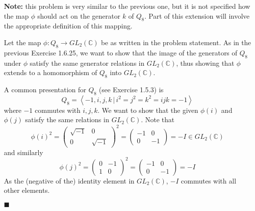\documentclass[12pt]{article}
\renewcommand{\qed}{\hfill$\blacksquare$}
\renewenvironment{proof}{\begin{addmargin}[1em]{0em}\begin{newproof}}{\end{newproof}\end{addmargin}\qed}
\begin{document}
\begin{proof}
\textbf{Note:} this problem is very similar to the previous one, but it is not specified how the map $\phi$ should act on the generator $k$ of $Q_8$. Part of this extension will involve the appropriate definition of this mapping.

Let the map $\phi: Q_8 \rightarrow GL_2\left(\mathbb{C}\right)$ be as written in the problem statement. As in the previous Exercise 1.6.25, we want to show that the image of the generators of $Q_8$ under $\phi$ satisfy the same generator relations in $GL_2\left(\mathbb{C}\right)$, thus showing that $\phi$ extends to a homomorphism of $Q_8$ into $GL_2\left(\mathbb{C}\right)$.

A common presentation for $Q_8$ (see Exercise 1.5.3) is
$$ Q_8 = \left\langle -1,i,j,k \, | \, i^2=j^2=k^2=ijk=-1 \right\rangle $$ where $-1$ commutes with $i,j,k$. We want to show that the given $\phi\left(i\right)$ and $\phi\left(j\right)$ satisfy the same relations in $GL_2\left(\mathbb{C}\right)$. Note that
$$ \phi\left(i\right)^2 =  \left(\begin{array}{cc} \sqrt{-1} & 0 \\ 0 & \sqrt{-1}\end{array}\right)^2 = \left(\begin{array}{cc} -1 & 0 \\ 0 & -1 \end{array}\right) = -I \in GL_2\left(\mathbb{C}\right) $$ and similarly
$$ \phi\left(j\right)^2 = \left(\begin{array}{cc} 0 & -1 \\ 1 & 0 \end{array}\right)^2 = \left(\begin{array}{cc} -1 & 0 \\ 0 & -1 \end{array}\right) = -I $$ As the (negative of the) identity element in $GL_2\left(\mathbb{C}\right)$, $-I$ commutes with all other elements.


\end{proof}
\end{document}
